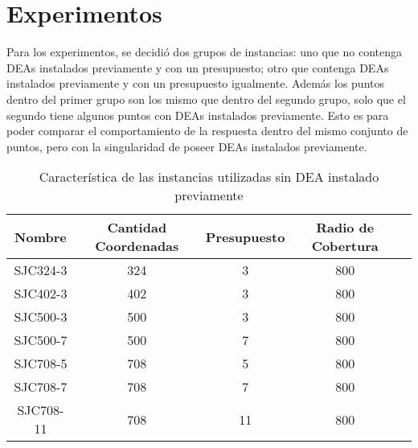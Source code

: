 \documentclass[letter, 10pt]{article}
\begin{document}
\section{Experimentos}

Para los experimentos, se decidi\'o dos grupos de instancias: uno que no contenga DEAs instalados previamente y con un presupuesto; otro que contenga DEAs instalados previamente y con un presupuesto igualmente. Adem\'as los puntos dentro del primer grupo son los mismo que dentro del segundo grupo, solo que el segundo tiene algunos puntos con DEAs instalados previamente. Esto es para poder comparar el comportamiento de la respuesta dentro del mismo conjunto de puntos, pero con la singularidad de poseer DEAs instalados previamente. 

\begin{table}[h!]
    \centering
    \begin{tabular}{|c|c|c|c|c|}
    \hline
    Nombre & Cantidad Coordenadas & Presupuesto & Radio de Cobertura\\
    \hline
    SJC324-3 & 324 & 3 & 800\\
    \hline
    SJC402-3 & 402 & 3 & 800\\
    \hline
    SJC500-3 & 500 & 3 & 800\\
    \hline
    SJC500-7 & 500 & 7 & 800\\
    \hline
    SJC708-5 & 708 & 5 & 800\\
    \hline
    SJC708-7 & 708 & 7 & 800\\
    \hline
    SJC708-11 & 708 & 11 & 800\\
    \hline
    
    \end{tabular}
    \caption{Caracter\'istica de las instancias utilizadas sin DEA instalado previamente}
    \label{tab:caract}
\end{table}
\end{document}
